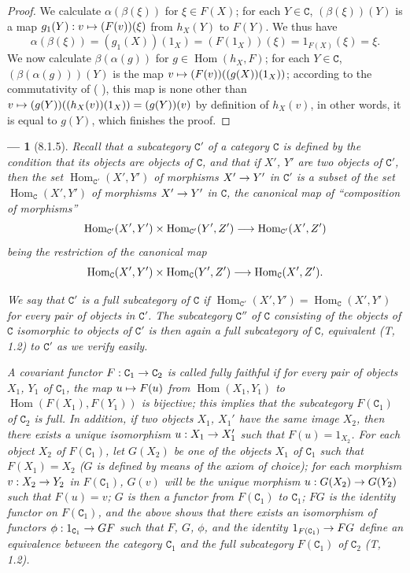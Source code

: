 \documentclass[oneside]{amsart}
\makeatletter
\theoremstyle{ega-env-style}
\newtheorem*{env}{---}
\theoremstyle{ega-thm-env-style}
\theoremstyle{ega-defn-env-style}
\def\cat{\mathtt}                   %
\def\vphi{\phi}                     %
\def\C{\cat{C}}                     %
\def\Hom{\operatorname{Hom}}
\renewcommand{\to}{\mathchoice{\longrightarrow}{\rightarrow}{\rightarrow}{\rightarrow}}
\let\mapstoo\mapsto
\renewcommand{\mapsto}{\mathchoice{\longmapsto}{\mapstoo}{\mapstoo}{\mapstoo}}
\newcommand{\oldpage}[2][]{{\marginnote{\normalfont{\textbf{#1}~|~#2}}}\ignorespaces}
\let\EGAOriginalLabel\label
\renewcommand{\label}[1]{\phantomsection\EGAOriginalLabel{#1}}
\let\EGAReaderOriginalHyperref\hyperref
\renewcommand{\hyperref}[2][]{%
  \@ifundefined{r@#1}{#2}{\EGAReaderOriginalHyperref[#1]{#2}}}
\makeatother
\begin{document}
\begin{proof}
We calculate $\alpha(\beta(\xi))$ for $\xi\in F(X)$; for each $Y\in\C$, $(\beta(\xi))(Y)$ is a map
$g_1(Y):v\mapsto(F(v))(\xi)$ from $h_X(Y)$ to $F(Y)$. We thus have
\[
  \alpha(\beta(\xi))=(g_1(X))(1_X)=(F(1_X))(\xi)=1_{F(X)}(\xi)=\xi.
\]
We now calculate $\beta(\alpha(g))$ for $g\in\Hom(h_X,F)$; for each $Y\in\C$, $(\beta(\alpha(g)))(Y)$
is the map $v\mapsto(F(v))((g(X))(1_X))$; according to the commutativity of (\hyperref[0.8.1.3.1]{8.1.3.1}), this map
is none other than $v\mapsto(g(Y))((h_X(v))(1_X))=(g(Y))(v)$ by definition of $h_X(v)$, in other words,
it is equal to $g(Y)$, which finishes the proof.
\end{proof}

\begin{env}[8.1.5]
\label{0.8.1.5}
Recall that a \emph{subcategory} $\C'$ of a category $\C$ is defined by the condition that its objects
are objects of $\C$, and that if $X'$, $Y'$ are two objects of $\C'$, then the set
$\Hom_{\C'}(X',Y')$ of morphisms $X'\to Y'$ \emph{in $\C'$} is a subset of the set $\Hom_\C(X',Y')$ of
morphisms $X'\to Y'$ \emph{in $\C$}, the canonical map of ``composition of morphisms''
\[
  \Hom_{\C'}(X',Y')\times\Hom_{\C'}(Y',Z')\to\Hom_{\C'}(X',Z')
\]
\oldpage[0\textsubscript{III}]{7}
being the restriction of the canonical map
\[
  \Hom_\C(X',Y')\times\Hom_\C(Y',Z')\to\Hom_\C(X',Z').
\]

We say that $\C'$ is a \emph{full} subcategory of $\C$ if $\Hom_{\C'}(X',Y')=\Hom_\C(X',Y')$ for every
pair of objects in $\C'$. The subcategory $\C''$ of $\C$ consisting of the objects of $\C$ isomorphic to
objects of $\C'$ is then again a full subcategory of $\C$, \emph{equivalent} (T, 1.2) to $\C'$ as we
verify easily.

A covariant functor $F:\C_1\to\C_2$ is called \emph{fully faithful} if for every pair of objects
$X_1$, $Y_1$ of $\C_1$, the map $u\mapsto F(u)$ from $\Hom(X_1,Y_1)$ to $\Hom(F(X_1),F(Y_1))$ is
\emph{bijective}; this implies that the subcategory $F(\C_1)$ of $\C_2$ is \emph{full}. In addition,
if two objects $X_1$, $X_1'$ have the same image $X_2$, then there exists a unique isomorphism
$u:X_1\to X_1'$ such that $F(u)=1_{X_2}$. For each object $X_2$ of $F(\C_1)$, let $G(X_2)$ be one of
the objects $X_1$ of $\C_1$ such that $F(X_1)=X_2$ ($G$ is defined by means of the axiom of choice); for
each morphism $v:X_2\to Y_2$ in $F(\C_1)$, $G(v)$ will be the unique morphism $u:G(X_2)\to G(Y_2)$ such
that $F(u)=v$; $G$ is then a \emph{functor} from $F(\C_1)$ to $\C_1$; $FG$ is the identity functor on
$F(\C_1)$, and the above shows that there exists an isomorphism of functors $\vphi:1_{\C_1}\to GF$
such that $F$, $G$, $\vphi$, and the identity $1_{F(\C_1)}\to FG$ define an \emph{equivalence} between
the category $\C_1$ and the full subcategory $F(\C_1)$ of $\C_2$ (T, 1.2).
\end{env}
\end{document}
